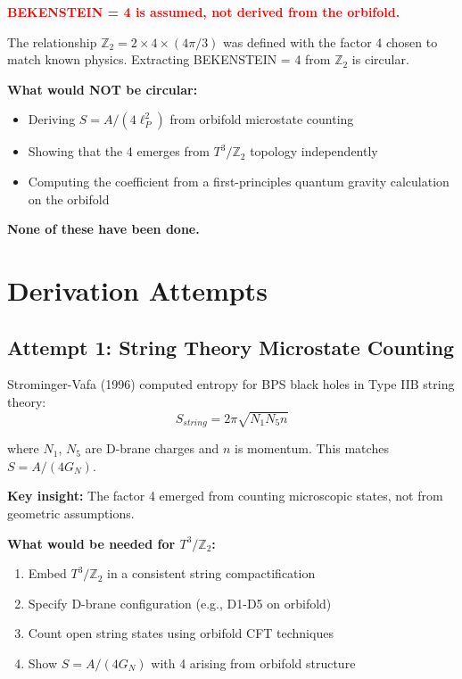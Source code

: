 \documentclass[12pt,a4paper]{article}
\begin{document}
\textcolor{red}{\textbf{BEKENSTEIN = 4 is assumed, not derived from the orbifold.}}

The relationship $\mathbb{Z}_2 = 2 \times 4 \times (4\pi/3)$ was defined with the factor 4 chosen to match known physics. Extracting BEKENSTEIN = 4 from $\mathbb{Z}_2$ is circular.

\textbf{What would NOT be circular:}
\begin{itemize}
    \item Deriving $S = A/(4\ell_P^2)$ from orbifold microstate counting
    \item Showing that the 4 emerges from $T^3/\mathbb{Z}_2$ topology independently
    \item Computing the coefficient from a first-principles quantum gravity calculation on the orbifold
\end{itemize}

\textbf{None of these have been done.}

\section{Derivation Attempts}

\subsection{Attempt 1: String Theory Microstate Counting}

Strominger-Vafa (1996) computed entropy for BPS black holes in Type IIB string theory:
\begin{equation}
S_{string} = 2\pi\sqrt{N_1 N_5 n}
\end{equation}

where $N_1$, $N_5$ are D-brane charges and $n$ is momentum. This matches $S = A/(4G_N)$.

\textbf{Key insight:} The factor 4 emerged from counting microscopic states, not from geometric assumptions.

\textbf{What would be needed for $T^3/\mathbb{Z}_2$:}
\begin{enumerate}
    \item Embed $T^3/\mathbb{Z}_2$ in a consistent string compactification
    \item Specify D-brane configuration (e.g., D1-D5 on orbifold)
    \item Count open string states using orbifold CFT techniques
    \item Show $S = A/(4G_N)$ with 4 arising from orbifold structure
\end{enumerate}
\end{document}
